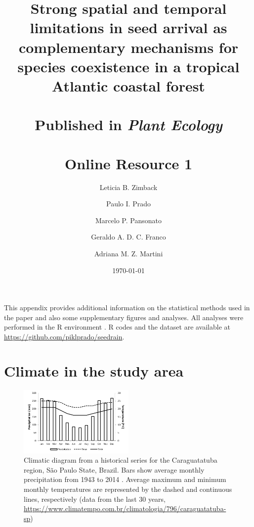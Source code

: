 \documentclass[A4]{article}
\begin{document}
\captionsetup{
    labelfont = bf,
    textfont  = it
  }


\title{Strong spatial and temporal limitations in seed arrival as
  complementary mechanisms for species coexistence in a tropical
  Atlantic coastal forest \\ \ \\
  Published in \emph{Plant Ecology} \\ \ \\
  \textbf{Online Resource 1}} 

\author[1,2]{Leticia B. Zimback}
\author[2]{Paulo I. Prado}
\author[2]{Marcelo P. Pansonato}
\author[3]{Geraldo A. D. C. Franco}
\author[2,4]{Adriana M. Z. Martini}



\date{\today}

\maketitle

This appendix provides additional information on the statistical
methods used in the paper and also some supplementary figures and
analyses. All analyses were performed in the R environment
\cite{Rcore}.  R codes and the dataset are available at
\url{https://github.com/piklprado/seedrain}.


\section*{Climate in the study area}

\begin{figure}[!htb]
  \centering
  \includegraphics[width=0.5\textwidth]{../figures/climate_diagram}
  \caption{Climatic diagram from a historical series for the
    Caraguatatuba region, São Paulo State, Brazil. Bars show average
    monthly precipitation from 1943 to 2014 \cite{Santos2019}. Average
    maximum and minimum monthly temperatures are represented by the
    dashed and continuous lines, respectively (data from the last 30
    years, \protect\url{https://www.climatempo.com.br/climatologia/796/caraguatatuba-sp})}
  \label{fig:climate_diag}
\end{figure}
\end{document}
